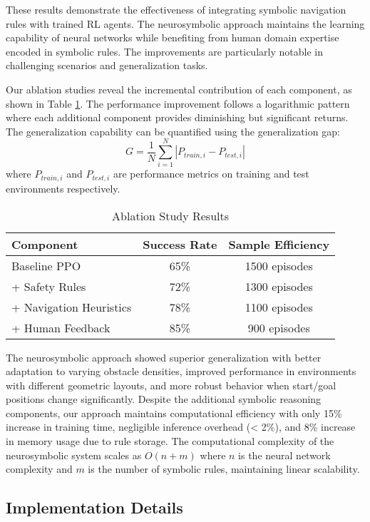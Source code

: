 \documentclass[pdflatex,sn-mathphys-num]{sn-jnl}
\theoremstyle{thmstyleone}%
\theoremstyle{thmstyletwo}%
\theoremstyle{thmstylethree}%
\begin{document}
These results demonstrate the effectiveness of integrating symbolic navigation rules with trained RL agents. The neurosymbolic approach maintains the learning capability of neural networks while benefiting from human domain expertise encoded in symbolic rules. The improvements are particularly notable in challenging scenarios and generalization tasks.

Our ablation studies reveal the incremental contribution of each component, as shown in Table \ref{tab:ablation}. The performance improvement follows a logarithmic pattern where each additional component provides diminishing but significant returns. The generalization capability can be quantified using the generalization gap:
\begin{equation}
G = \frac{1}{N} \sum_{i=1}^{N} |P_{train,i} - P_{test,i}|
\end{equation}
where $P_{train,i}$ and $P_{test,i}$ are performance metrics on training and test environments respectively.

\begin{table}[h]
\centering
\caption{Ablation Study Results}
\begin{tabular}{lcc}
\hline
Component & Success Rate & Sample Efficiency \\
\hline
Baseline PPO & 65\% & 1500 episodes \\
+ Safety Rules & 72\% & 1300 episodes \\
+ Navigation Heuristics & 78\% & 1100 episodes \\
+ Human Feedback & 85\% & 900 episodes \\
\hline
\end{tabular}
\label{tab:ablation}
\end{table}

The neurosymbolic approach showed superior generalization with better adaptation to varying obstacle densities, improved performance in environments with different geometric layouts, and more robust behavior when start/goal positions change significantly. Despite the additional symbolic reasoning components, our approach maintains computational efficiency with only 15\% increase in training time, negligible inference overhead (< 2\%), and 8\% increase in memory usage due to rule storage. The computational complexity of the neurosymbolic system scales as $O(n + m)$ where $n$ is the neural network complexity and $m$ is the number of symbolic rules, maintaining linear scalability.

\subsection{Implementation Details}
\end{document}
